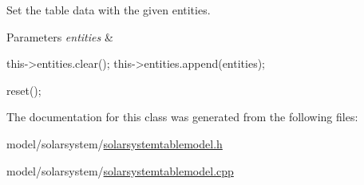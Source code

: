 \-Set the table data with the given entities. 


\begin{DoxyParams}{\-Parameters}
{\em entities} & \\
\hline
\end{DoxyParams}

\begin{DoxyCode}
{
    this->entities.clear();
    this->entities.append(entities);

    reset();
}
\end{DoxyCode}


\-The documentation for this class was generated from the following files\-:\begin{DoxyCompactItemize}
\item 
model/solarsystem/\hyperlink{solarsystemtablemodel_8h}{solarsystemtablemodel.\-h}\item 
model/solarsystem/\hyperlink{solarsystemtablemodel_8cpp}{solarsystemtablemodel.\-cpp}\end{DoxyCompactItemize}
